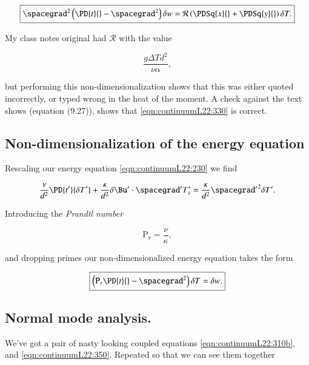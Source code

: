 \begin{equation}\label{eqn:continuumL22:310b}
\boxed{
\spacegrad^2 \left( 
\PD{t}{} - \spacegrad^2 
\right)
\delta w
=
\mathcal{R} \left( 
\PDSq{x}{}
+\PDSq{y}{}
\right) \delta T.
}
\end{equation}

My class notes original had $\mathcal{R}$ with the value

\begin{equation*}
\frac{g \Delta T d^2}{\nu \alpha},
\end{equation*}

but performing this non-dimensionalization shows that this was either quoted incorrectly, or typed wrong in the heat of the moment.  A check against the text shows (equation (9.27)), shows that \ref{eqn:continuumL22:330} is correct.

\subsection{Non-dimensionalization of the energy equation}

Rescaling our energy equation \ref{eqn:continuumL22:230} we find

\begin{equation}\label{eqn:continuumL22:230b}
\frac{\nu}{d^2} \PD{t'}{\delta T'} + \frac{\kappa}{d^2} \delta \Bu' \cdot \spacegrad' T_s' = \frac{\kappa}{d^2} {\spacegrad'}^2 \delta T'.
\end{equation}

Introducing the \textit{Prandtl number}

\begin{equation}\label{eqn:continuumL22:370}
\text{P}_r = \frac{\nu}{\kappa},
\end{equation}

and dropping primes our non-dimensionalized energy equation takes the form

\begin{equation}\label{eqn:continuumL22:350}
\boxed{
\left( 
\text{P}_r
\PD{t}{} - \spacegrad^2 \right) \delta T = \delta w.
}
\end{equation}

\subsection{Normal mode analysis.}

We've got a pair of nasty looking coupled equations \ref{eqn:continuumL22:310b}, and \ref{eqn:continuumL22:350}.  Repeated so that we can see them together


